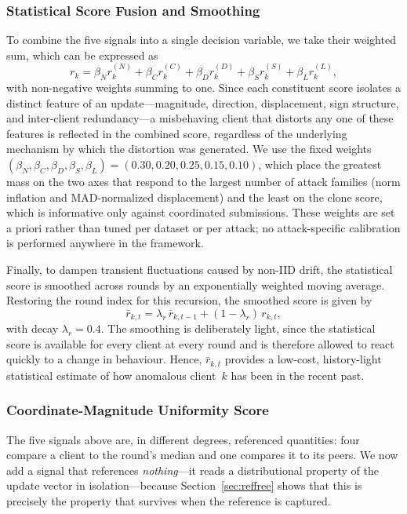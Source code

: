 \documentclass[journal]{IEEEtran}
\begin{document}
\subsubsection{Statistical Score Fusion and Smoothing}
To combine the five signals into a single decision variable, we take their weighted sum, which can be expressed as
\begin{equation}
r_k = \beta_N r_k^{(N)} + \beta_C r_k^{(C)} + \beta_D r_k^{(D)} + \beta_S r_k^{(S)} + \beta_L r_k^{(L)},
\label{eq:stat_score}
\end{equation}
with non-negative weights summing to one. Since each constituent score isolates a distinct feature of an update---magnitude, direction, displacement, sign structure, and inter-client redundancy---a misbehaving client that distorts any one of these features is reflected in the combined score, regardless of the underlying mechanism by which the distortion was generated. We use the fixed weights $(\beta_N, \beta_C, \beta_D, \beta_S, \beta_L) = (0.30, 0.20, 0.25, 0.15, 0.10)$, which place the greatest mass on the two axes that respond to the largest number of attack families (norm inflation and MAD-normalized displacement) and the least on the clone score, which is informative only against coordinated submissions. These weights are set a priori rather than tuned per dataset or per attack; no attack-specific calibration is performed anywhere in the framework.

Finally, to dampen transient fluctuations caused by non-IID drift, the statistical score is smoothed across rounds by an exponentially weighted moving average. Restoring the round index for this recursion, the smoothed score is given by
\begin{equation}
\bar r_{k,t} = \lambda_r\,\bar r_{k,t-1} + (1-\lambda_r)\,r_{k,t},
\label{eq:stat_ewma}
\end{equation}
with decay $\lambda_r = 0.4$. The smoothing is deliberately light, since the statistical score is available for every client at every round and is therefore allowed to react quickly to a change in behaviour. Hence, $\bar r_{k,t}$ provides a low-cost, history-light statistical estimate of how anomalous client~$k$ has been in the recent past.

\subsubsection{Coordinate-Magnitude Uniformity Score}
\label{sec:uniformity}
The five signals above are, in different degrees, referenced quantities: four compare a client to the round's median and one compares it to its peers. We now add a signal that references \emph{nothing}---it reads a distributional property of the update vector in isolation---because Section~\ref{sec:reffree} shows that this is precisely the property that survives when the reference is captured.
\end{document}
